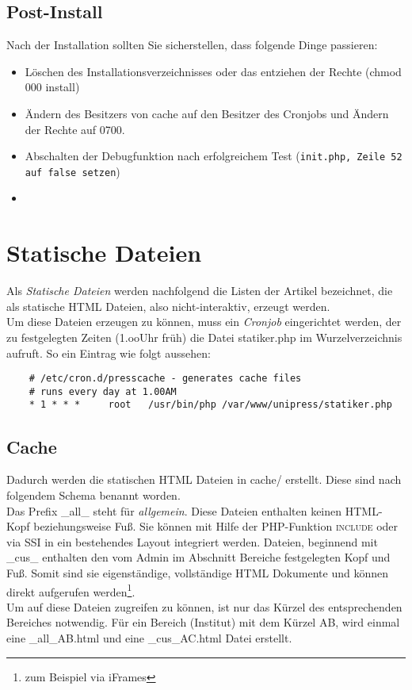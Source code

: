 \documentclass[a4paper,10pt,twoside]{article}
\begin{document}
 \subsection{Post-Install}
   Nach der Installation sollten Sie sicherstellen, dass folgende Dinge
   passieren: 
   \begin{itemize}
     \item Löschen des Installationsverzeichnisses oder das entziehen der Rechte
     (chmod 000 install)
     \item Ändern des Besitzers von \textsf{cache} auf den Besitzer des Cronjobs
     und Ändern der Rechte auf 0700.
     \item Abschalten der Debugfunktion nach erfolgreichem Test
     (\texttt{init.php, Zeile 52 auf false setzen})
     \item 
   \end{itemize}
%
\section{Statische Dateien}
Als \textit{Statische Dateien} werden nachfolgend die Listen der Artikel
bezeichnet, die als statische HTML Dateien, also nicht-interaktiv, erzeugt
werden. \\
Um diese Dateien erzeugen zu können, muss ein \textit{Cronjob} eingerichtet
werden, der zu festgelegten Zeiten (1.ooUhr früh) die Datei
\textsf{statiker.php} im Wurzelverzeichnis aufruft. So ein Eintrag wie folgt
aussehen:
%
{\tiny
	\begin{lstlisting}
	# /etc/cron.d/presscache - generates cache files
	# runs every day at 1.00AM
	* 1 * * *     root   /usr/bin/php /var/www/unipress/statiker.php
	\end{lstlisting}
}
%
\subsection{Cache}
Dadurch werden die statischen HTML Dateien in \textsf{cache/} erstellt. Diese 
sind nach folgendem Schema benannt worden. \\
Das Prefix \textsf{\_all\_} steht für \textit{allgemein}. Diese Dateien enthalten
keinen HTML-Kopf beziehungsweise Fuß. Sie können mit Hilfe der PHP-Funktion 
\textsc{include} oder via SSI in ein bestehendes Layout integriert werden.
Dateien, beginnend mit \textsf{\_cus\_} enthalten den vom Admin im Abschnitt 
Bereiche festgelegten Kopf und Fuß. Somit sind sie eigenständige, vollständige 
HTML Dokumente und können direkt aufgerufen werden\footnote{zum Beispiel via 
iFrames}.\\
Um auf diese Dateien zugreifen zu können, ist nur das Kürzel des entsprechenden
Bereiches notwendig. Für ein Bereich (Institut) mit dem Kürzel AB, wird einmal
eine \textsf{\_all\_AB.html} und eine \textsf{\_cus\_AC.html} Datei erstellt.
\end{document}
